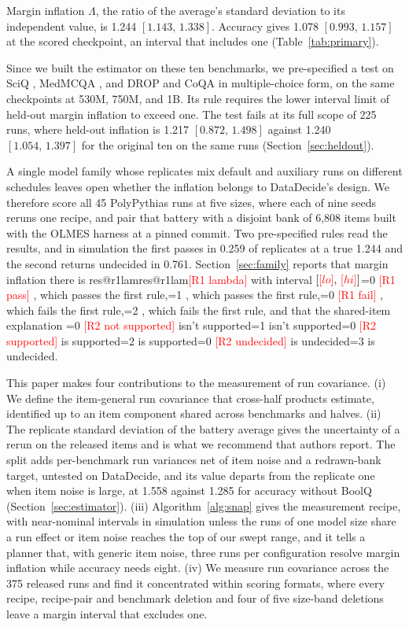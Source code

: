 \documentclass{article}
\makeatletter
\newcommand{\ci}[2]{\ensuremath{[#1,\,#2]}}
\newcommand{\Lam}{\Lambda}
\newcommand{\pending}[1]{\textcolor{red}{[#1]}}
\newcommand{\Ronecase}{0}
\newcommand{\Rtwocase}{0}
\newcommand{\outcome}[4]{\ifnum#1=0 \pending{#3} #4\else\ifnum#1=#2 #4\fi\fi}
\newcommand{\res}[2]{\ifcsname res@#1\endcsname\csname res@#1\endcsname\else\pending{#2}\fi}
\makeatother
\begin{document}
Margin inflation $\Lam$, the ratio of the average's standard deviation to its independent value, is 1.244 \ci{1.143}{1.338}. Accuracy gives 1.078 \ci{0.993}{1.157} at the scored checkpoint, an interval that includes one (Table~\ref{tab:primary}).

Since we built the estimator on these ten benchmarks, we pre-specified a test on SciQ \citep{welbl2017sciq}, MedMCQA \citep{pal2022medmcqa}, and DROP \citep{dua2019drop} and CoQA \citep{reddy2019coqa} in multiple-choice form, on the same checkpoints at 530M, 750M, and 1B. Its rule requires the lower interval limit of held-out margin inflation to exceed one. The test fails at its full scope of 225 runs, where held-out inflation is 1.217 \ci{0.872}{1.498} against 1.240 \ci{1.054}{1.397} for the original ten on the same runs (Section~\ref{sec:heldout}).

A single model family whose replicates mix default and auxiliary runs on different schedules leaves open whether the inflation belongs to DataDecide's design. We therefore score all 45 PolyPythias runs at five sizes, where each of nine seeds reruns one recipe, and pair that battery with a disjoint bank of 6,808 items built with the OLMES harness \citep{gu2025olmes} at a pinned commit. Two pre-specified rules read the results, and in simulation the first passes in 0.259 of replicates at a true 1.244 and the second returns undecided in 0.761. Section~\ref{sec:family} reports that margin inflation there is \res{r1lam}{R1 lambda} with interval \ci{\res{r1lo}{lo}}{\res{r1hi}{hi}}\outcome{\Ronecase}{1}{R1 pass}{, which passes the first rule,}\outcome{\Ronecase}{2}{R1 fail}{, which fails the first rule,} and that the shared-item explanation \outcome{\Rtwocase}{1}{R2 not supported}{isn't supported}\outcome{\Rtwocase}{2}{R2 supported}{is supported}\outcome{\Rtwocase}{3}{R2 undecided}{is undecided}.

This paper makes four contributions to the measurement of run covariance. (i) We define the item-general run covariance that cross-half products estimate, identified up to an item component shared across benchmarks and halves. (ii) The replicate standard deviation of the battery average gives the uncertainty of a rerun on the released items and is what we recommend that authors report. The split adds per-benchmark run variances net of item noise and a redrawn-bank target, untested on DataDecide, and its value departs from the replicate one when item noise is large, at 1.558 against 1.285 for accuracy without BoolQ (Section~\ref{sec:estimator}). (iii) Algorithm~\ref{alg:snap} gives the measurement recipe, with near-nominal intervals in simulation unless the runs of one model size share a run effect or item noise reaches the top of our swept range, and it tells a planner that, with generic item noise, three runs per configuration resolve margin inflation while accuracy needs eight. (iv) We measure run covariance across the 375 released runs and find it concentrated within scoring formats, where every recipe, recipe-pair and benchmark deletion and four of five size-band deletions leave a margin interval that excludes one.
\end{document}
